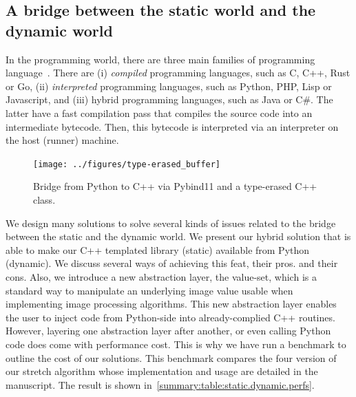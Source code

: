 \subsection*{A bridge between the static world and the dynamic world}


In the programming world, there are three main families of programming language~\parencite{prechelt.2000.comparison}.
There are (i) \emph{compiled} programming languages, such as C, C++, Rust or Go, (ii) \emph{interpreted} programming
languages, such as Python, PHP, Lisp or Javascript, and (iii) hybrid programming languages, such as Java or C\#. The
latter have a fast compilation pass that compiles the source code into an intermediate bytecode. Then, this bytecode is
interpreted via an interpreter on the host (runner) machine.

\begin{figure}[htbp]
  \centering
  \texttt{[image: ../figures/type-erased\_buffer]}
  \caption[]{Bridge from Python to C++ via Pybind11 and a type-erased C++ class.}
  \label{summary:fig:type-erased.buffer}
\end{figure}

We design many solutions to solve several kinds of issues related to the bridge between the static and the dynamic
world. We present our hybrid solution that is able to make our C++ templated library (static) available from Python
(dynamic). We discuss several ways of achieving this feat, their pros. and their cons. Also, we introduce a new
abstraction layer, the value-set, which is a standard way to manipulate an underlying image value usable when
implementing image processing algorithms. This new abstraction layer enables the user to inject code from Python-side
into already-complied C++ routines. However, layering one abstraction layer after another, or even calling Python code
does come with performance cost. This is why we have run a benchmark to outline the cost of our solutions. This
benchmark compares the four version of our stretch algorithm whose implementation and usage are detailed in the
manuscript. The result is shown in~\cref{summary:table:static.dynamic.perfs}.

